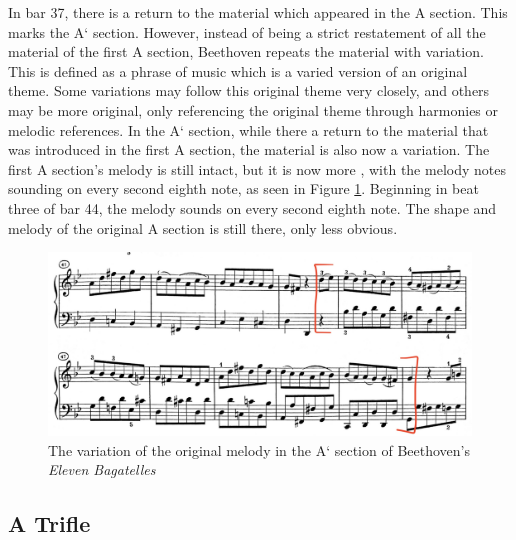 In bar 37, there is a return to the material which appeared in the A section. This marks the A` section. However, instead of being a strict restatement of all the material of the first A section, Beethoven repeats the material with variation. This is defined as a phrase of music which is a varied version of an original theme. Some variations may follow this original theme very closely, and others may be more original, only referencing the original theme through harmonies or melodic references.\autocite{Kennedy_Kennedy_Rutherford-Johnson_2013b} In the A` section, while there a return to the material that was introduced in the first A section, the material is also now a variation. The first A section's melody is still intact, but it is now more , with the melody notes sounding on every second eighth note, as seen in Figure \ref{fig:beethoven-a-prime-melody-variation}\autocite{Henle_1978}. Beginning in beat three of bar 44, the melody sounds on every second eighth note. The shape and melody of the original A section is still there, only less obvious.

\begin{figure}
	\centering
	\includegraphics[width=\textwidth]{figures/beethoven-a-prime-melody-variation}
	\caption{The variation of the original melody in the A` section of Beethoven's \textit{Eleven Bagatelles}}
	\label{fig:beethoven-a-prime-melody-variation}
\end{figure}

\subsection{A Trifle}


